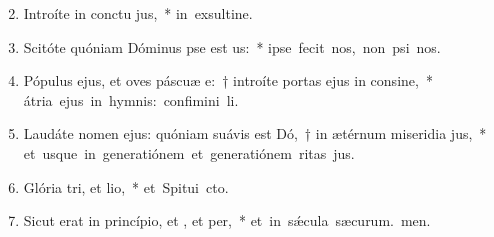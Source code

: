 \begin{flushleft}
\begin{enumerate}[leftmargin=*]
\setcounter{enumi}{1}


\item Introíte in conctu jus,~* \mbox{in exsultine.}
\item Scitóte quóniam Dóminus pse est us:~* \mbox{ipse fecit nos,  non psi nos.}
\item Pópulus ejus, et oves páscuæ e:~† introíte portas ejus in consine,~* \mbox{átria ejus in hymnis: confimini li.}
\item Laudáte nomen ejus: quóniam suávis est Dó,~† in ætérnum miseridia jus,~* \mbox{et usque in generatiónem et generatiónem ritas jus.}
\item Glória tri, et lio,~* \mbox{et Spitui cto.}
\item Sicut erat in princípio, et , et per,~* \mbox{et in s\'{\ae}cula sæcurum. men.}

\end{enumerate}
\end{flushleft}

